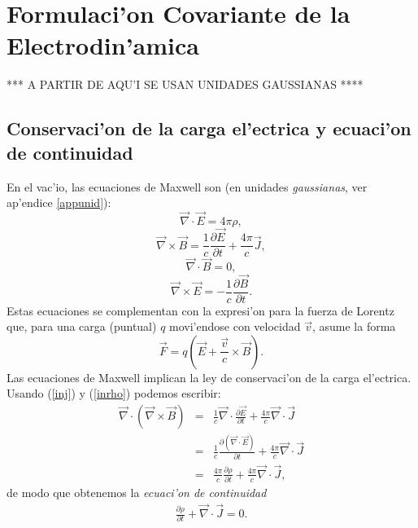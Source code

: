 \chapter{Formulaci'on Covariante de la Electrodin'amica}

*** A PARTIR DE AQU'I SE USAN UNIDADES GAUSSIANAS ****


\section{Conservaci'on de la carga el'ectrica y ecuaci'on de continuidad}

En el vac'io, las ecuaciones de Maxwell son (en unidades \textit{gaussianas}, ver ap'endice
\ref{appunid}):
\begin{equation}\label{inrho}
\vec{\nabla}\cdot \vec{E} = 4\pi \rho ,
\end{equation}
\begin{equation}\label{inj}
\vec{\nabla}\times \vec{B} = \frac{1}{c} \frac{\partial \vec{E}}{\partial t} +
\frac{4\pi}{c} \vec{J} ,
\end{equation}
\begin{equation}\label{db0}
\vec{\nabla}\cdot \vec{B} =0 ,
\end{equation}
\begin{equation}\label{de+}
\vec{\nabla}\times \vec{E} = - \frac{1}{c} \frac{\partial \vec{B}}{\partial t} .
\end{equation}
Estas ecuaciones se complementan con la expresi'on para la fuerza de Lorentz que, para una carga (puntual) $q$ movi'endose con velocidad $\vec{v}$, asume la forma
\begin{equation}
\vec{F} = q \left( \vec{E} + \frac{\vec v}{c}\times \vec{B}\right) .
\end{equation}
Las ecuaciones de Maxwell implican la ley de conservaci'on de la carga el'ectrica. Usando (\ref{inj}) y (\ref{inrho}) podemos escribir:
\begin{eqnarray}
\vec{\nabla}\cdot (\vec{\nabla}\times \vec{B}) &=& \frac{1}{c} \vec{\nabla}\cdot
\frac{\partial \vec{E}}{\partial t} + \frac{4\pi}{c} \vec{\nabla}\cdot \vec{J}\\
 &=& \frac{1}{c} \frac{\partial (\vec{\nabla}\cdot \vec{E})}{\partial t} +
\frac{4\pi}{c} \vec{\nabla}\cdot \vec{J}\\
&=&\frac{4\pi}{c} \frac{\partial \rho}{\partial t} + \frac{4\pi}{c}
\vec{\nabla}\cdot \vec{J} ,
\end{eqnarray}
de modo que obtenemos la \textit{ecuaci'on de continuidad}
\begin{eqnarray}
\frac{\partial \rho}{\partial t} + \vec{\nabla}\cdot \vec{J} = 0 .
\label{eccont}
\end{eqnarray}

